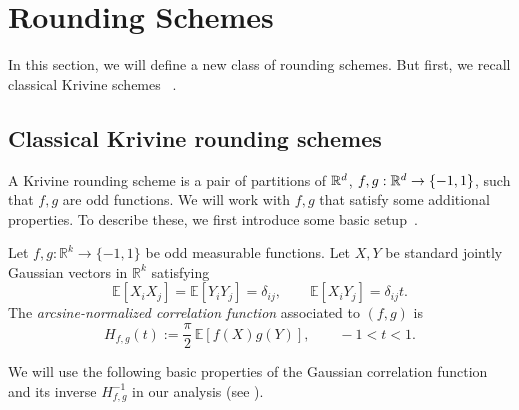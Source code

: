 \section{Rounding Schemes}

In this section, we will define a new class of rounding schemes. But first, we recall classical Krivine schemes ~\cite{krivine1977constante}. 

\subsection{Classical Krivine rounding schemes}
\label{sec:krivine-rounding-scheme}

A Krivine rounding scheme is a pair of partitions of $\mathbb{R}^d$, $f,g: \mathbb{R}^d \rightarrow \{-1,1\}$, such that $f,g$ are odd functions. We will work with $f,g$ that satisfy some additional properties. To describe these, we first introduce some basic setup~\cite{braverman2011grothendieckconstantstrictlysmaller}. 


\begin{definition}\label{def:gaussian-correlation}
Let $f,g:\mathbb{R}^k\to\{-1,1\}$ be odd measurable functions.
Let $X, Y$ be standard jointly Gaussian vectors in $\mathbb{R}^k$ satisfying
\[
\mathbb{E}[X_iX_j]
=
\mathbb{E}[Y_iY_j]
=
\delta_{ij},
\qquad
\mathbb{E}[X_iY_j]
=
\delta_{ij}t.
\]
The \emph{arcsine-normalized correlation function} associated to $(f,g)$ is
\[
H_{f,g}(t)
:=
\frac{\pi}{2}\,
\mathbb{E}\left[
f\left(X\right)
g\left(
Y
\right)
\right],
\qquad -1<t<1.
\]
\end{definition}

We will use the following basic properties of the Gaussian correlation function and its inverse $H_{f,g}^{-1}$ in our analysis (see \cite{braverman2011grothendieckconstantstrictlysmaller}).


